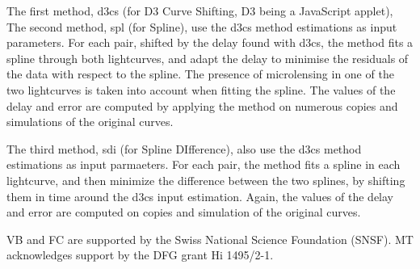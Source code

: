 \documentclass[traditabstract]{aa}
\begin{document}
The first method, d3cs (for D3 Curve Shifting, D3 being a JavaScript applet), 
The second method, spl (for Spline), use the d3cs method estimations as input parameters. For each pair, shifted by the delay found with d3cs, the method fits a spline through both lightcurves, and adapt the delay to minimise the residuals of the data with respect to the spline. The presence of microlensing in one of the two lightcurves is taken into account when fitting the spline. The values of the delay and error are computed by applying the method on numerous copies and simulations of the original curves.

The third method, sdi (for Spline DIfference), also use the d3cs method estimations as input parmaeters. For each pair, the method fits a spline in each lightcurve, and then minimize the difference between the two splines, by shifting them in time around the d3cs input estimation. Again, the values of the delay and error are computed on copies and simulation of the original curves.




\begin{acknowledgements}
VB and FC are supported by the Swiss National Science Foundation (SNSF). MT acknowledges support by the DFG grant Hi 1495/2-1.
\end{acknowledgements}





\end{document}
